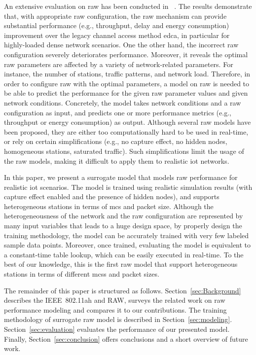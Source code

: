 An extensive evaluation on \gls{raw} has been conducted in ~\cite{WoWMoM2016}. The results demonstrate that, with appropriate \gls{raw} configuration, the \gls{raw} mechanism can provide substantial performance (e.g., throughput, delay and energy consumption) improvement over the legacy channel access method \gls{edca}, in particular for highly-loaded dense network scenarios. One the other hand, the incorrect \gls{raw} configuration severely deteriorates performance. Moreover, it reveals the optimal \gls{raw} parameters are affected by a variety of network-related parameters. For instance, the number of stations, traffic patterns, and network load. Therefore, in order to configure \gls{raw} with the optimal parameters, a model on \gls{raw} is needed to be able to predict the performance for the given \gls{raw} parameter values and given network conditions. Concretely, the model takes network conditions and a \gls{raw} configuration as input, and predicts one or more performance metrics (e.g., throughput or energy consumption) as output. Although several \gls{raw} models have been proposed, they are either too computationally hard to be used in real-time, or rely on certain simplifications (e.g., no capture effect, no hidden nodes, homogeneous stations, saturated traffic). Such simplifications limit the usage of the \gls{raw} models, making it difficult to apply them to realistic \gls{iot} networks.

In this paper, we present a surrogate model that models \gls{raw} performance for realistic \gls{iot} scenarios. The model is trained using realistic simulation results (with capture effect enabled and the presence of hidden nodes), and supports heterogeneous stations in terms of \gls{mcs} and packet size. Although the heterogeneousness of the network and  the \gls{raw} configuration are represented by many input variables that leads to a huge design space, by properly design the  training methodology, the model can be accurately trained with very few labeled sample data points. Moreover, once trained, evaluating the model is equivalent to a constant-time table lookup, which can be easily executed in real-time. To the best of our knowledge, this is the first \gls{raw} model that support heterogeneous stations in terms of different \gls{mcs}s and packet sizes.


The remainder of this paper is structured as follows. Section~\ref{sec:Background} describes the IEEE~802.11ah and RAW, surveys the related work on \gls{raw} performance modeling and compares it to our contributions.
The training methodology of surrogate \gls{raw} model is described in Section~\ref{sec:modeling}. Section~\ref{sec:evaluation} evaluates the performance of our presented model. Finally, Section~\ref{sec:conclusion} offers conclusions and a short overview of future work.


